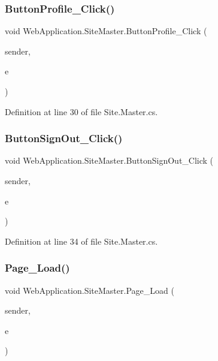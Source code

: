 \subsubsection{\texorpdfstring{ButtonProfile\_Click()}{ButtonProfile\_Click()}}
{\footnotesize\ttfamily void Web\+Application.\+Site\+Master.\+Button\+Profile\+\_\+\+Click (\begin{DoxyParamCaption}\item[{object}]{sender,  }\item[{Event\+Args}]{e }\end{DoxyParamCaption})\hspace{0.3cm}{\ttfamily [protected]}}



Definition at line 30 of file Site.\+Master.\+cs.

\mbox{\label{classWebApplication_1_1SiteMaster_ac4ef9b7a8418e64628e7301d7e2f4ac5}} 
\subsubsection{\texorpdfstring{ButtonSignOut\_Click()}{ButtonSignOut\_Click()}}
{\footnotesize\ttfamily void Web\+Application.\+Site\+Master.\+Button\+Sign\+Out\+\_\+\+Click (\begin{DoxyParamCaption}\item[{object}]{sender,  }\item[{Event\+Args}]{e }\end{DoxyParamCaption})\hspace{0.3cm}{\ttfamily [protected]}}



Definition at line 34 of file Site.\+Master.\+cs.

\mbox{\label{classWebApplication_1_1SiteMaster_af0e97c0a323fbba69b667fd6a11a9c53}} 
\subsubsection{\texorpdfstring{Page\_Load()}{Page\_Load()}}
{\footnotesize\ttfamily void Web\+Application.\+Site\+Master.\+Page\+\_\+\+Load (\begin{DoxyParamCaption}\item[{object}]{sender,  }\item[{Event\+Args}]{e }\end{DoxyParamCaption})\hspace{0.3cm}{\ttfamily [protected]}}



